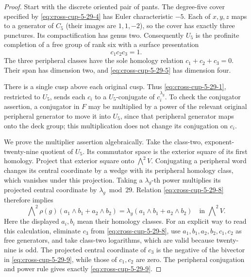 \begin{proof}
Start with the discrete oriented pair of pants.
The degree-five cover specified by \eqref{eq:cross-cup-5-29-4} has Euler
characteristic \(-5\).
Each of \(x,y,z\) maps to a generator of \(C_5\)
(their images are \(1,1,-2\)), so the cover has exactly
three punctures.
Its compactification has genus two.
Consequently \(U_5\) is the profinite completion of a
free group of rank six with a surface presentation
\begin{equation}
 [a_1,b_1][a_2,b_2]c_1c_2c_3=1.                           \label{eq:cross-cup-5-29-8}
\end{equation}
The three peripheral classes have the sole homology
relation \(c_1+c_2+c_3=0\).
Their span has dimension two, and \eqref{eq:cross-cup-5-29-5} has dimension four.

There is a single cusp above each original cusp.
Thus \eqref{eq:cross-cup-5-29-1}, restricted to \(U_5\), sends each \(c_i\) to
a \(U_5\)-conjugate of \(c_i^{\lambda_g}\).
To check the conjugator assertion, a conjugator in \(F\)
may be multiplied by a power of the relevant original
peripheral generator to move it into \(U_5\), since that
peripheral generator maps onto the deck group; this
multiplication does not change its conjugation on \(c_i\).

We prove the multiplier assertion algebraically.
Take the class-two, exponent-twenty-nine quotient of
\(U_5\).
Its commutator space is the exterior square of its
first homology.
Project that exterior square onto \(\bigwedge^2 V\).
Conjugating a peripheral word changes its central
coordinate by a wedge with its peripheral homology
class, which vanishes under this projection.
Taking a \(\lambda_g\)-th power multiplies its projected
central coordinate by \(\lambda_g\bmod29\).
Relation \eqref{eq:cross-cup-5-29-8} therefore implies
\begin{equation}
 \bigwedge\nolimits^2\rho(g)
       (a_1\wedge b_1+a_2\wedge b_2)
   =\lambda_g
       (a_1\wedge b_1+a_2\wedge b_2)
       \quad\text{in }\bigwedge\nolimits^2V.               \label{eq:cross-cup-5-29-9}
\end{equation}
Here the displayed \(a_i,b_i\) mean their homology classes.
For an explicit way to read this calculation, eliminate
\(c_3\) from \eqref{eq:cross-cup-5-29-8}, use
\(a_1,b_1,a_2,b_2,c_1,c_2\) as free generators, and take
class-two logarithms, which are valid because twenty-nine
is odd. The projected central coordinate of \(c_3\) is
the negative of the bivector in \eqref{eq:cross-cup-5-29-9}, while those of
\(c_1,c_2\) are zero. The peripheral conjugation and
power rule gives exactly \eqref{eq:cross-cup-5-29-9}.


\end{proof}
